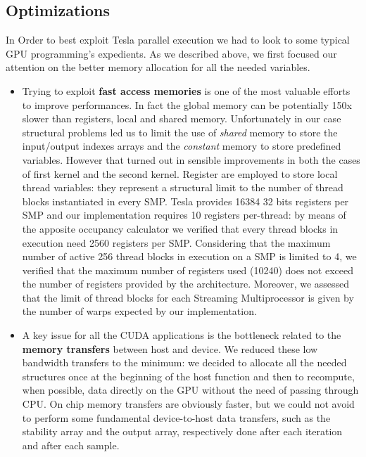 \subsection{Optimizations}
In Order to best exploit Tesla parallel execution we had to look to some typical GPU programming's expedients.
As we described above, we first focused our attention on the better memory allocation for all the needed variables.
\begin{itemize}
 \item Trying to exploit \textbf{fast access memories} is one of the most valuable efforts to improve performances.
In fact the global memory can be potentially 150x slower than registers, local and shared memory.\newline
Unfortunately in our case structural problems led us to limit the use of \textit{shared} memory to store the input/output indexes arrays and  the
\textit{constant} memory to store predefined variables. However that turned out in sensible improvements in both the cases of first kernel and
the second kernel. Register are employed to store local thread variables: they represent a structural limit to the number of thread blocks 
instantiated in every SMP. Tesla provides 16384 32 bits registers per SMP and our implementation requires 10 registers per-thread: by means of the 
apposite occupancy calculator we verified that every thread blocks in execution need 2560 registers per SMP.
Considering that the maximum number of active 256 thread blocks in execution on a SMP is limited to 4, we verified that the maximum 
number of registers used (10240) does not exceed the number of registers provided by the architecture. Moreover, we assessed that the limit
of thread blocks for each Streaming Multiprocessor is given by the number of warps expected by our implementation.

\item A key issue for all the CUDA applications is the bottleneck related to the \textbf{memory transfers} between host and device.
We reduced these low bandwidth transfers to the minimum: we decided to allocate all the needed structures once at the beginning of
the host function and then to recompute, when possible, data directly on the GPU without the need of passing through CPU. On chip memory transfers are
obviously faster, but we could not avoid to perform some fundamental device-to-host data transfers, such as the stability array and the output
array, respectively done after each iteration and after each sample.


\end{itemize}
